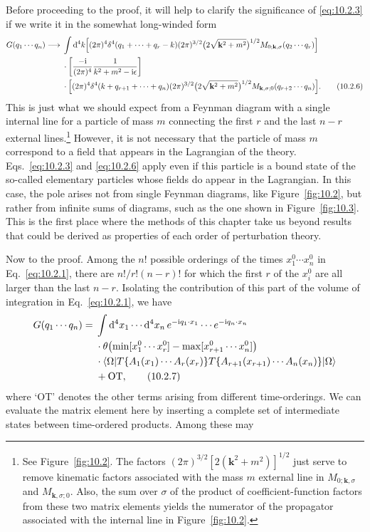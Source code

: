 Before proceeding to the proof, it will help to clarify the significance of
\eqref{eq:10.2.3} if we write it in the somewhat long-winded form
\begin{align}
  G(q_1\cdots q_n)\longrightarrow{}&\int \mathop{}\!\mathrm{d}^4k
  \Bigl[(2\pi)^4\delta^4(q_1+\cdots+q_r-k)(2\pi)^{3/2}
  \bigl(2\sqrt{\mathbf k^2+m^2}\bigr)^{1/2}
  M_{0;\mathbf k,\sigma}(q_2\cdots q_r)\Bigr]
  \notag\\
  &\cdot\left[\frac{-\mathrm{i}}{(2\pi)^4}\frac{1}{k^2+m^2-\mathrm{i}\epsilon}\right]
  \notag\\
  &\cdot\Bigl[(2\pi)^4\delta^4(k+q_{r+1}+\cdots+q_n)(2\pi)^{3/2}
  \bigl(2\sqrt{\mathbf k^2+m^2}\bigr)^{1/2}
  M_{\mathbf k,\sigma;0}(q_{r+2}\cdots q_n)\Bigr].
  \tag{10.2.6}\label{eq:10.2.6}
\end{align}
This is just what we should expect from a Feynman diagram with a single
internal line for a particle of mass $m$ connecting the first $r$ and the last
$n-r$ external lines.\footnote{See Figure~\ref{fig:10.2}. The factors
$(2\pi)^{3/2}[2(\mathbf k^2+m^2)]^{1/2}$ just serve to remove kinematic factors
associated with the mass $m$ external line in $M_{0;\mathbf k,\sigma}$ and
$M_{\mathbf k,\sigma;0}$. Also, the sum over $\sigma$ of the product of
coefficient-function factors from these two matrix elements yields the numerator of
the propagator associated with the internal line in Figure~\ref{fig:10.2}.} However, it is
not necessary that the particle of mass $m$ correspond to a field that appears
in the Lagrangian of the theory. Eqs.~\eqref{eq:10.2.3} and \eqref{eq:10.2.6} apply even if this
particle is a bound state of the so-called elementary particles whose fields
do appear in the Lagrangian. In this case, the pole arises not from single
Feynman diagrams, like Figure~\ref{fig:10.2}, but rather from infinite sums of diagrams,
such as the one shown in Figure~\ref{fig:10.3}. This is the first place where the methods
of this chapter take us beyond results that could be derived as properties of
each order of perturbation theory.

Now to the proof. Among the $n!$ possible orderings of the times $x_1^0\cdots x_n^0$
in Eq.~\eqref{eq:10.2.1}, there are $n!/r!(n-r)!$ for which the first $r$ of the $x_i^0$ are
all larger than the last $n-r$. Isolating the contribution of this part of the
volume of integration in Eq.~\eqref{eq:10.2.1}, we have
\begin{align}
  G(q_1\cdots q_n)={}&\int \mathop{}\!\mathrm{d}^4x_1\cdots \mathop{}\!\mathrm{d}^4x_n\,
  e^{-\mathrm{i} q_1\cdot x_1}\cdots e^{-\mathrm{i} q_n\cdot x_n}
  \notag\\
  &\cdot\theta\!\left(\min[x_1^0\cdots x_r^0]
  -\max[x_{r+1}^0\cdots x_n^0]\right)
  \notag\\
  &\cdot\langle \Omega\rvert T\{A_1(x_1)\cdots A_r(x_r)\}
  T\{A_{r+1}(x_{r+1})\cdots A_n(x_n)\}\lvert \Omega\rangle
  \notag\\
  &+\mathrm{OT},
  \tag{10.2.7}\label{eq:10.2.7}
\end{align}
where `OT' denotes the other terms arising from different time-orderings.
We can evaluate the matrix element here by inserting a complete set of
intermediate states between time-ordered products. Among these may

